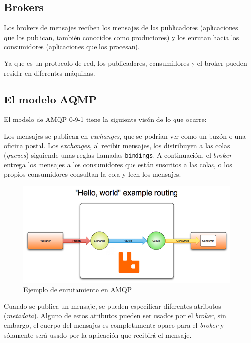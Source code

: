 \subsection{Brokers}

Los brokers de mensajes reciben los mensajes de los publicadores (aplicaciones
que los publican, también conocidos como productores) y los enrutan hacia los
consumidores (aplicaciones que los procesan).

Ya que es un protocolo de red, los publicadores, consumidores y el broker pueden
residir en diferentes máquinas.

\subsection{El modelo AQMP}

El modelo de AMQP 0-9-1 tiene la siguiente visón de lo que ocurre:

Los mensajes se publican en \emph{exchanges}, que se podrían ver como un buzón
o una oficina postal. Los \emph{exchanges}, al recibir mensajes, los distribuyen
a las colas (\emph{queues}) siguiendo unas reglas llamadas \texttt{bindings}.
A continuación, el \emph{broker} entrega los mensajes a los consumidores
que están suscritos a las colas, o los propios consumidores consultan la cola
y leen los mensajes.

\begin{figure}[htbp]
\centering
\includegraphics[width=\linewidth]{03-mqtt_stomp_amqp/figuras/fig002}
\caption{Ejemplo de enrutamiento en AMQP}
\label{fig:figura2}
\end{figure}

Cuando se publica un mensaje, se pueden especificar diferentes atributos (\emph{metadata}).
Alguno de estos atributos pueden ser usados por el \emph{broker}, sin embargo,
el cuerpo del mensajes es completamente opaco para el \emph{broker} y sólamente
será usado por la aplicación que recibirá el mensaje.

